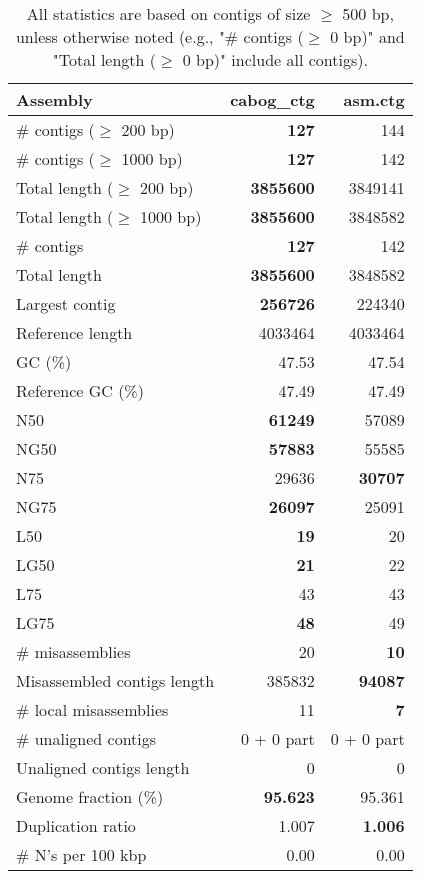 \documentclass[12pt,a4paper]{article}
\begin{document}
\begin{table}[ht]
\begin{center}
\caption{All statistics are based on contigs of size $\geq$ 500 bp, unless otherwise noted (e.g., "\# contigs ($\geq$ 0 bp)" and "Total length ($\geq$ 0 bp)" include all contigs).}
\begin{tabular}{|l*{2}{|r}|}
\hline
Assembly & cabog\_ctg & asm.ctg \\ \hline
\# contigs ($\geq$ 200 bp) & {\bf 127} & 144 \\ \hline
\# contigs ($\geq$ 1000 bp) & {\bf 127} & 142 \\ \hline
Total length ($\geq$ 200 bp) & {\bf 3855600} & 3849141 \\ \hline
Total length ($\geq$ 1000 bp) & {\bf 3855600} & 3848582 \\ \hline
\# contigs & {\bf 127} & 142 \\ \hline
Total length & {\bf 3855600} & 3848582 \\ \hline
Largest contig & {\bf 256726} & 224340 \\ \hline
Reference length & 4033464 & 4033464 \\ \hline
GC (\%) & 47.53 & 47.54 \\ \hline
Reference GC (\%) & 47.49 & 47.49 \\ \hline
N50 & {\bf 61249} & 57089 \\ \hline
NG50 & {\bf 57883} & 55585 \\ \hline
N75 & 29636 & {\bf 30707} \\ \hline
NG75 & {\bf 26097} & 25091 \\ \hline
L50 & {\bf 19} & 20 \\ \hline
LG50 & {\bf 21} & 22 \\ \hline
L75 & 43 & 43 \\ \hline
LG75 & {\bf 48} & 49 \\ \hline
\# misassemblies & 20 & {\bf 10} \\ \hline
Misassembled contigs length & 385832 & {\bf 94087} \\ \hline
\# local misassemblies & 11 & {\bf 7} \\ \hline
\# unaligned contigs & 0 + 0 part & 0 + 0 part \\ \hline
Unaligned contigs length & 0 & 0 \\ \hline
Genome fraction (\%) & {\bf 95.623} & 95.361 \\ \hline
Duplication ratio & 1.007 & {\bf 1.006} \\ \hline
\# N's per 100 kbp & 0.00 & 0.00 \\ \hline

\end{tabular}
\end{center}
\end{table}
\end{document}
